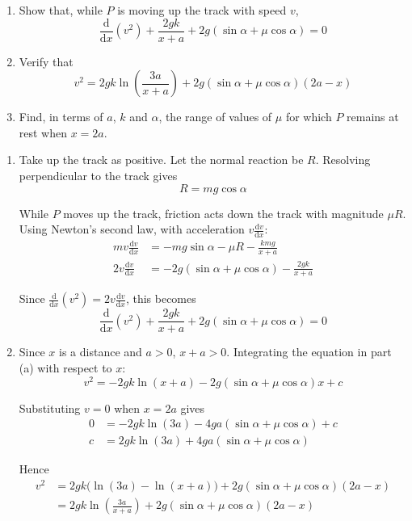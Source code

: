 \documentclass[leqno]{article}
\begin{document}
\begin{enumerate}[
  label=\textbf{\arabic*.},
  leftmargin=*,
  topsep=0pt,
  partopsep=0pt,
  parsep=0pt
]
\begin{enumerate}[label=\textbf{(\alph*)}]
  \item Show that, while $P$ is moving up the track with speed $v$,
  \[
  \frac{\mathrm{d}}{\mathrm{d}x}(v^2)+\frac{2gk}{x+a}+2g(\sin\alpha+\mu\cos\alpha)=0
  \]
  \item Verify that
  \[
  v^2=2gk\ln\left(\frac{3a}{x+a}\right)+2g(\sin\alpha+\mu\cos\alpha)(2a-x)
  \]
  \item Find, in terms of $a$, $k$ and $\alpha$, the range of values of $\mu$ for which $P$ remains at rest when $x=2a$.  \\
\end{enumerate}

\vspace*{10pt}

\begin{djsSolution}
\begin{enumerate}[label=\textbf{(\alph*)}, start=1]
\item Take up the track as positive. Let the normal reaction be \(R\). Resolving perpendicular to the track gives
\[
R=mg\cos\alpha
\]

While \(P\) moves up the track, friction acts down the track with magnitude \(\mu R\). Using Newton's second law, with acceleration \(v\frac{\mathrm{d}v}{\mathrm{d}x}\):
\begin{align*}
mv\frac{\mathrm{d}v}{\mathrm{d}x}
&=-mg\sin\alpha-\mu R-\frac{kmg}{x+a}\\
2v\frac{\mathrm{d}v}{\mathrm{d}x}
&=-2g(\sin\alpha+\mu\cos\alpha)-\frac{2gk}{x+a}
\end{align*}

Since \(\frac{\mathrm{d}}{\mathrm{d}x}(v^2)=2v\frac{\mathrm{d}v}{\mathrm{d}x}\), this becomes
\[
\frac{\mathrm{d}}{\mathrm{d}x}(v^2)+\frac{2gk}{x+a}+2g(\sin\alpha+\mu\cos\alpha)=0
\]

\item Since \(x\) is a distance and \(a>0\), \(x+a>0\). Integrating the equation in part (a) with respect to \(x\):
\[
v^2=-2gk\ln(x+a)-2g(\sin\alpha+\mu\cos\alpha)x+c
\]

Substituting \(v=0\) when \(x=2a\) gives
\begin{align*}
0&=-2gk\ln(3a)-4ga(\sin\alpha+\mu\cos\alpha)+c\\
c&=2gk\ln(3a)+4ga(\sin\alpha+\mu\cos\alpha)
\end{align*}

Hence
\begin{align*}
v^2&=2gk\bigl(\ln(3a)-\ln(x+a)\bigr)
+2g(\sin\alpha+\mu\cos\alpha)(2a-x)\\
&=2gk\ln\left(\frac{3a}{x+a}\right)
+2g(\sin\alpha+\mu\cos\alpha)(2a-x)
\end{align*}


\end{enumerate}
\end{djsSolution}
\end{enumerate}
\end{document}
